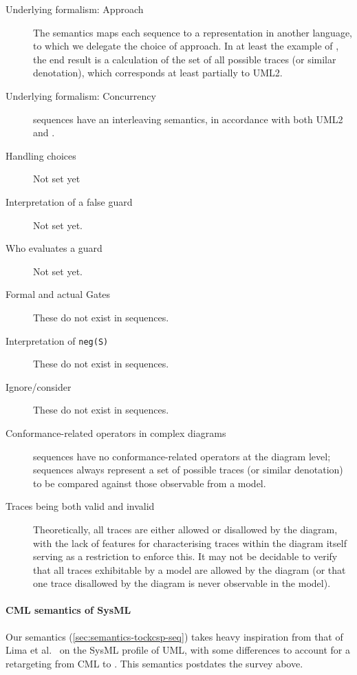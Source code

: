 \begin{description}
\item[Underlying formalism: Approach]
  The \langname{} semantics maps each sequence to a representation in another
  language, to which we delegate the choice of approach.
  In at least the example of \tockcsp, the end result is a calculation of the
  set of all possible traces (or similar denotation), which corresponds at
  least partially to UML2.
\item[Underlying formalism: Concurrency]
  \langname{} sequences have an interleaving semantics, in accordance with
  both UML2 and \tockcsp.
\item[Handling choices]
  Not set yet
\item[Interpretation of a false guard]
  Not set yet.
\item[Who evaluates a guard]
  Not set yet.
\item[Formal and actual Gates]
  These do not exist in \langname{} sequences.
\item[Interpretation of \texttt{neg(S)}]
  These do not exist in \langname{} sequences.
\item[Ignore/consider]
  These do not exist in \langname{} sequences.
\item[Conformance-related operators in complex diagrams]
  \langname{} sequences have no conformance-related operators at the diagram
  level; sequences always represent a set of possible traces (or similar
  denotation) to be compared against those observable from a model.
\item[Traces being both valid and invalid]
  Theoretically, all traces are either allowed or disallowed by the diagram,
  with the lack of features for characterising traces within the diagram itself
  serving as a restriction to enforce this.  It may not
  be decidable to verify that all traces exhibitable by a model are allowed by
  the diagram (or that one trace disallowed by the diagram is never observable
  in the model).
\end{description}

\paragraph{CML semantics of SysML}

Our semantics (\cref{sec:semantics-tockcsp-seq}) takes heavy inspiration from
that of Lima et al.~\cite{lima-semantics} on the SysML profile of UML, with
some differences to account for a retargeting from CML to \tockcsp.  This
semantics postdates the survey above.

